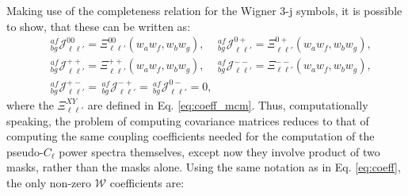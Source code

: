 \documentclass[a4paper,11pt]{article}
\begin{document}
        Making use of the completeness relation for the Wigner 3-j symbols, it is possible to show, that these can be written as:
        \begin{align}\label{eq:coeff_cmcm}
          &\,^{af}_{bg}\mathcal{J}^{00}_{\ell\ell'}=\Xi^{00}_{\ell\ell'}(w_aw_f,w_bw_g),\hspace{12pt}
           \,^{af}_{bg}\mathcal{J}^{0+}_{\ell\ell'}=\Xi^{0+}_{\ell\ell'}(w_aw_f,w_bw_g),\\
          &\,^{af}_{bg}\mathcal{J}^{++}_{\ell\ell'}=\Xi^{++}_{\ell\ell'}(w_aw_f,w_bw_g),\hspace{12pt}
           \,^{af}_{bg}\mathcal{J}^{--}_{\ell\ell'}=\Xi^{--}_{\ell\ell'}(w_aw_f,w_bw_g),\\
          &\,^{af}_{bg}\mathcal{J}^{+-}_{\ell\ell'}=
           \,^{af}_{bg}\mathcal{J}^{-+}_{\ell\ell'}=
           \,^{af}_{bg}\mathcal{J}^{0-}_{\ell\ell'}=0,
        \end{align}
        where the $\Xi^{XY}_{\ell\ell'}$ are defined in Eq. \ref{eq:coeff_mcm}.
        Thus, computationally speaking, the problem of computing covariance matrices reduces to that of computing the same coupling coefficients needed for the computation of the pseudo-$C_\ell$ power spectra themselves, except now they involve product of two masks, rather than the masks alone. Using the same notation as in Eq. \ref{eq:coeff}, the only non-zero $\mathcal{W}$ coefficients are:
\end{document}
